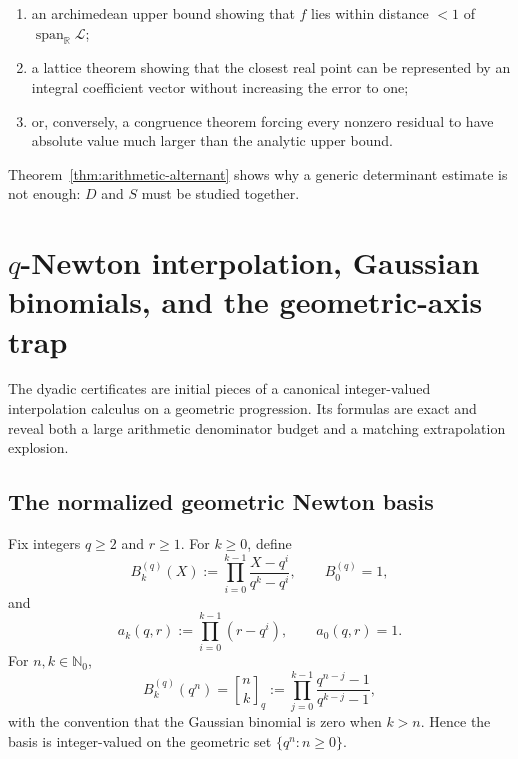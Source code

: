 \documentclass[11pt,oneside]{article}
\theoremstyle{definition}
\theoremstyle{remark}
\newcommand{\Nzero}{\mathbb N_0}
\newcommand{\R}{\mathbb R}
\newcommand{\qbinom}[3]{\genfrac{[}{]}{0pt}{}{#1}{#2}_{#3}}
\begin{document}
\begin{enumerate}
\item an archimedean upper bound showing that $f$ lies within distance $<1$ of
      $\operatorname{span}_\R\mathcal L$;
\item a lattice theorem showing that the closest real point can be represented by an integral
      coefficient vector without increasing the error to one;
\item or, conversely, a congruence theorem forcing every nonzero residual to have absolute
      value much larger than the analytic upper bound.
\end{enumerate}

Theorem~\ref{thm:arithmetic-alternant} shows why a generic determinant estimate is not enough:
$D$ and $S$ must be studied together.

\section{$q$-Newton interpolation, Gaussian binomials, and the geometric-axis trap}
\label{sec:qnewton}

The dyadic certificates are initial pieces of a canonical integer-valued interpolation
calculus on a geometric progression.  Its formulas are exact and reveal both a large
arithmetic denominator budget and a matching extrapolation explosion.

\subsection{The normalized geometric Newton basis}

Fix integers $q\ge2$ and $r\ge1$.  For $k\ge0$, define
\begin{equation}
 B_k^{(q)}(X):=
 \prod_{i=0}^{k-1}\frac{X-q^i}{q^k-q^i},
 \qquad B_0^{(q)}=1,
 \label{eq:q-newton-basis}
\end{equation}
and
\begin{equation}
 a_k(q,r):=\prod_{i=0}^{k-1}(r-q^i),
 \qquad a_0(q,r)=1.
 \label{eq:q-newton-coeff}
\end{equation}
For $n,k\in\Nzero$,
\begin{equation}
 B_k^{(q)}(q^n)=
 \qbinom{n}{k}{q}
 :=\prod_{j=0}^{k-1}\frac{q^{n-j}-1}{q^{k-j}-1},
 \label{eq:gaussian-value}
\end{equation}
with the convention that the Gaussian binomial is zero when $k>n$.  Hence the basis is
integer-valued on the geometric set $\{q^n:n\ge0\}$.
\end{document}
